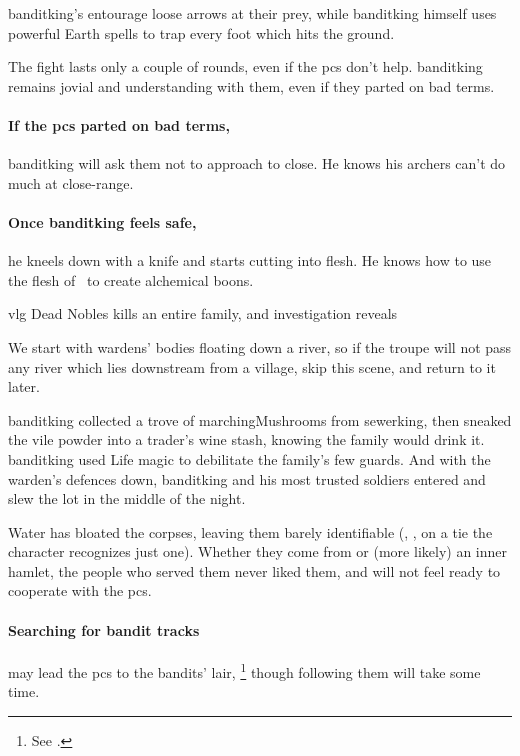 \Gls{banditking}'s entourage loose arrows at their prey, while \gls{banditking} himself uses powerful Earth \glspl{spell} to trap every foot which hits the ground.

The fight lasts only a couple of rounds, even if the \glspl{pc} don't help.
\Gls{banditking} remains jovial and understanding with them, even if they parted on bad terms.

\paragraph{If the \glspl{pc} parted on bad terms,}
\gls{banditking} will ask them not to approach to close.
He knows his archers can't do much at close-range.

\paragraph{Once \gls{banditking} feels safe,}
he kneels down with a knife and starts cutting into flesh.
He knows how to use the flesh of \localMonster\ to create alchemical \glspl{boon}.

{\gls{vlg} Dead Nobles}%
{ kills an entire  family, and investigation reveals }%

We start with \glspl{warden}' bodies floating down a river, so if the troupe will not pass any river which lies downstream from a \gls{village}, skip this scene, and return to it later.

\begin{exampletext}
  \Gls{banditking} collected a trove of \glspl{marchingMushroom} from \gls{sewerking}, then sneaked the vile powder into a trader's wine stash, knowing the family would drink it.
  \Gls{banditking} used Life magic to debilitate the family's few guards.
  And with the \gls{warden}'s defences down, \gls{banditking} and his most trusted soldiers entered and slew the lot in the middle of the night.
\end{exampletext}

Water has bloated the corpses, leaving them barely identifiable (, \tn[11], on a tie the character recognizes just one).
Whether they come from  or (more likely) an inner hamlet, the people who served them never liked them, and will not feel ready to cooperate with the \glspl{pc}.

\paragraph{Searching for bandit tracks}
may lead the \glspl{pc} to the bandits' lair,%
\footnote{See .}
though following them will take some time.

